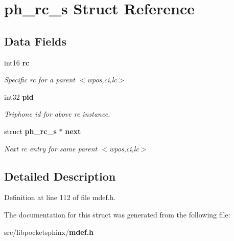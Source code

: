 \section{ph\-\_\-rc\-\_\-s Struct Reference}
\label{structph__rc__s}
\subsection*{Data Fields}
\begin{DoxyCompactItemize}
\item 
int16 {\bf rc}\label{structph__rc__s_ab0f0852e254c04a1cb11de805b698733}

\begin{DoxyCompactList}\small\item\em Specific rc for a parent $<$wpos,ci,lc$>$ \end{DoxyCompactList}\item 
int32 {\bf pid}\label{structph__rc__s_a9762d0f7b4b9f284fd2b3ff735b4256b}

\begin{DoxyCompactList}\small\item\em Triphone id for above rc instance. \end{DoxyCompactList}\item 
struct {\bf ph\-\_\-rc\-\_\-s} $\ast$ {\bf next}\label{structph__rc__s_ae05aead721c5cfdd27ac90378bb80f3c}

\begin{DoxyCompactList}\small\item\em Next rc entry for same parent $<$wpos,ci,lc$>$ \end{DoxyCompactList}\end{DoxyCompactItemize}


\subsection{Detailed Description}


Definition at line 112 of file mdef.\-h.



The documentation for this struct was generated from the following file\-:\begin{DoxyCompactItemize}
\item 
src/libpocketsphinx/{\bf mdef.\-h}\end{DoxyCompactItemize}
